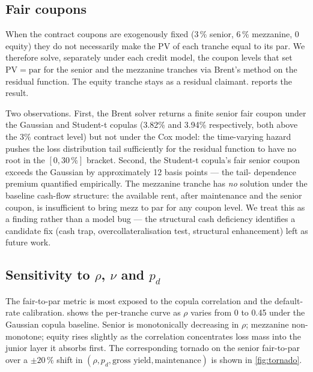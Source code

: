 \subsection{Fair coupons}\label{ssec:fair-coupons}

When the contract coupons are exogenously fixed (3\,\% senior, 6\,\%
mezzanine, 0 equity) they do not necessarily make the PV of each tranche
equal to its par. We therefore solve, separately under each credit model,
the coupon levels that set $\mathrm{PV} = \text{par}$ for the senior and
the mezzanine tranches via Brent's method on the residual function. The
equity tranche stays as a residual claimant. 
reports the result.



Two observations. First, the Brent solver returns a finite senior fair
coupon under the Gaussian and Student-t copulas (3.82\% and 3.94\%
respectively, both above the 3\% contract level) but not under the Cox
model: the time-varying hazard pushes the loss distribution tail
sufficiently for the residual function to have no root in the
$[0, 30\,\%]$ bracket. Second, the Student-t copula's fair senior coupon
exceeds the Gaussian by approximately 12 basis points --- the tail-
dependence premium quantified empirically. The mezzanine tranche has
\emph{no} solution under the baseline cash-flow structure: the available
rent, after maintenance and the senior coupon, is insufficient to bring
mezz to par for any coupon level. We treat this as a finding rather than
a model bug — the structural cash deficiency identifies a candidate
fix (cash trap, overcollateralisation test, structural enhancement)
left as future work.

\subsection{Sensitivity to $\rho$, $\nu$ and $p_d$}\label{ssec:sensitivity}

The fair-to-par metric is most exposed to the copula correlation and the
default-rate calibration.  shows the per-tranche
curve as $\rho$ varies from 0 to 0.45 under the Gaussian copula baseline.
Senior is monotonically decreasing in $\rho$; mezzanine non-monotone;
equity rises slightly as the correlation concentrates loss mass into the
junior layer it absorbs first. The corresponding tornado on the senior
fair-to-par over a $\pm 20\,\%$ shift in $(\rho, p_d, \text{gross yield},
\text{maintenance})$ is shown in \cref{fig:tornado}.

